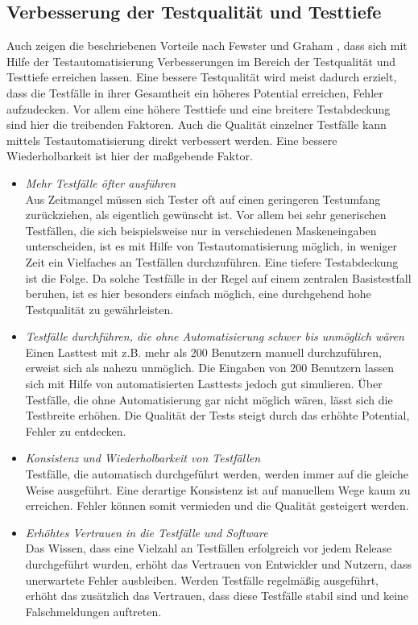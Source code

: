 \subsection{Verbesserung der Testqualität und Testtiefe}
\label{sec:verbesserung_der_testqualität_und_testtiefe}
Auch zeigen die beschriebenen Vorteile nach Fewster und Graham \cite[vgl. S. 9 ff.]{fewster_software_1999}, dass sich mit Hilfe der Testautomatisierung Verbesserungen im Bereich der Testqualität und Testtiefe erreichen lassen. Eine bessere Testqualität wird meist dadurch erzielt, dass die Testfälle in ihrer Gesamtheit ein höheres Potential erreichen, Fehler aufzudecken. Vor allem eine höhere Testtiefe und eine breitere Testabdeckung sind hier die treibenden Faktoren. Auch die Qualität einzelner Testfälle kann mittels Testautomatisierung direkt verbessert werden. Eine bessere Wiederholbarkeit ist hier der maßgebende Faktor.


\begin{itemize}
\item \textit{Mehr Testfälle öfter ausführen} \\
Aus Zeitmangel müssen sich Tester oft auf einen geringeren Testumfang zurückziehen, als eigentlich gewünscht ist. Vor allem bei sehr generischen Testfällen, die sich beispielsweise nur in verschiedenen Maskeneingaben unterscheiden, ist es mit Hilfe von Testautomatisierung möglich, in weniger Zeit ein Vielfaches an Testfällen durchzuführen.
Eine tiefere Testabdeckung ist die Folge. Da solche Testfälle in der Regel auf einem zentralen Basistestfall beruhen, ist es hier besonders einfach möglich, eine durchgehend hohe Testqualität zu gewährleisten.
\item \textit{Testfälle durchführen, die ohne Automatisierung schwer bis unmöglich wären} \\
Einen Lasttest mit z.B. mehr als 200 Benutzern manuell durchzuführen, erweist sich als nahezu unmöglich. Die Eingaben von 200 Benutzern lassen sich mit Hilfe von automatisierten Lasttests jedoch gut simulieren. Über Testfälle, die ohne Automatisierung gar nicht möglich wären, lässt sich die Testbreite erhöhen. Die Qualität der Tests steigt durch das erhöhte Potential, Fehler zu entdecken.
\item \textit{Konsistenz und Wiederholbarkeit von Testfällen} \\
Testfälle, die automatisch durchgeführt werden, werden immer auf die gleiche Weise ausgeführt. Eine derartige Konsistenz ist auf manuellem Wege kaum zu erreichen. Fehler können somit vermieden und die Qualität gesteigert werden. 
\item \textit{Erhöhtes Vertrauen in die Testfälle und Software } \\
Das Wissen, dass eine Vielzahl an Testfällen erfolgreich vor jedem Release durchgeführt wurden, erhöht das Vertrauen von Entwickler und Nutzern, dass unerwartete Fehler ausbleiben.
Werden Testfälle regelmäßig ausgeführt, erhöht das zusätzlich das Vertrauen, dass diese Testfälle stabil sind und keine Falschmeldungen auftreten.
\end{itemize}


